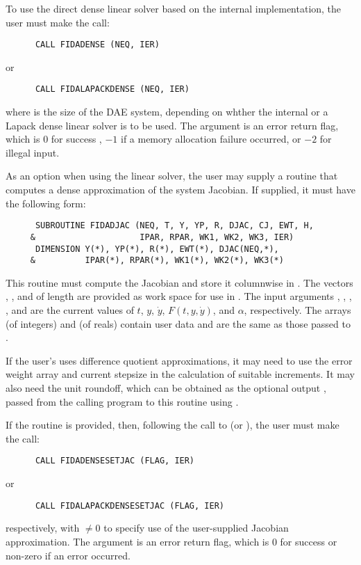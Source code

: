 \begin{Steps}
  To use the direct dense linear solver based on the internal {\ida}
  implementation, the user must make the call:
\begin{verbatim}
      CALL FIDADENSE (NEQ, IER)
\end{verbatim}
  or
\begin{verbatim}
      CALL FIDALAPACKDENSE (NEQ, IER)
\end{verbatim}
  where  is the size of the DAE system, depending on whther the internal
  or a Lapack dense linear solver is to be used.
  The argument  is an error return flag, which is $0$ 
  for success , $-1$ if a memory allocation failure occurred, or $-2$ for illegal input.

  As an option when using the {\dense} linear solver, the user may supply a
  routine that computes a dense approximation of the system Jacobian. If supplied,
  it must have the following form:
\begin{verbatim}
      SUBROUTINE FIDADJAC (NEQ, T, Y, YP, R, DJAC, CJ, EWT, H,
     &                     IPAR, RPAR, WK1, WK2, WK3, IER)
      DIMENSION Y(*), YP(*), R(*), EWT(*), DJAC(NEQ,*), 
     &          IPAR(*), RPAR(*), WK1(*), WK2(*), WK3(*)
\end{verbatim}
  This routine must compute the Jacobian and store it columnwise in .
  The vectors , , and  of length  are provided
  as work space for use in .
  The input arguments , , , , and  are the
  current values of $t$, $y$, $\dot{y}$, $F(t,y,\dot{y})$, and $\alpha$, respectively.
  The arrays  (of integers) and  (of reals) contain user data
  and are the same as those passed to .
  
  If the user's  uses difference quotient approximations, it
  may need to use the error weight array  and current stepsize 
  in the calculation of suitable increments.  It may also need the unit
  roundoff, which can be obtained as the optional output ,
  passed from the calling program to this routine using .

  If the  routine is provided, then, following the call to  
  (or ), the user must make the call:
\begin{verbatim}
      CALL FIDADENSESETJAC (FLAG, IER)
\end{verbatim}
  or
\begin{verbatim}
      CALL FIDALAPACKDENSESETJAC (FLAG, IER)
\end{verbatim}
  respectively, with  $\neq 0$ to specify use of the user-supplied Jacobian
  approximation.  The argument  is an error return flag, which is $0$ 
  for success or non-zero if an error occurred.
  

\end{Steps}
